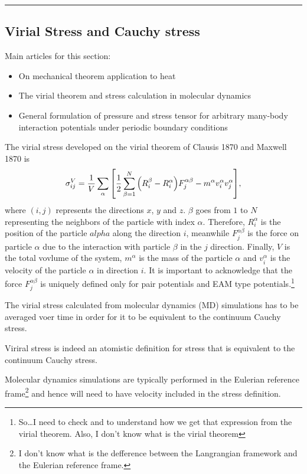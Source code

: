 \documentclass[../../main-notes.tex]{subfiles}
\begin{document}
\noindent\rule{2cm}{0.4pt}

\subsection{Virial Stress and Cauchy stress}


Main articles for this section:
\begin{itemize}
    \item On mechanical theorem application to heat
    \item The virial theorem and stress calculation in molecular dynamics 
    \item General formulation of pressure and stress tensor for arbitrary many-body interaction potentials under periodic boundary conditions
\end{itemize}

The virial stress developed on the virial theorem of Clausis 1870 and Maxwell 1870 is 
\begin{gather}
    \sigma_{ij}^V = \frac{1}{V}\sum_\alpha\qty[\frac{1}{2}\sum_{\beta=1}^N\qty(R_i^\beta-R^\alpha_i)F^{\alpha\beta}_j-m^\alpha v_i^\alpha v_j^\alpha]\label{eqn-mdStress},
\end{gather}
where $(i,j)$ represents the directions $x$, $y$ and $z$.
$\beta$ goes from $1$ to $N$ representing the neighbors of the particle with index $\alpha$.
Therefore, $R^\alpha_i$ is the position of the particle $alpha$ along the direction $i$, meanwhile $F^{\alpha\beta}_j$ is the force on particle $\alpha$ due to the interaction with particle $\beta$ in the $j$ direction.
Finally, $V$ is the total vovlume of the system, $m^\alpha$ is the mass of the particle $\alpha$ and $v^\alpha_i$ is the velocity of the particle $\alpha$ in direction $i$.
It is important to acknowledge that the force $F^{\alpha\beta}_j$ is uniquely defined only for pair potentials and EAM type potentials.\footnote{So\ldots I need to check\citep{Swenson_1983} and\citep{Tsai_1979} to understand how we get that expression from the virial theorem. Also, I don't know what is the virial theorem  }


The virial stress calculated from molecular dynamics (MD) simulations has to be averaged voer time in order for it to be equivalent to the continuum Cauchy stress\citep{Subramaniyan_Sun_2008}.

Viriral stress is indeed an atomistic definition for stress that is equivalent to the continuum Cauchy stress.


Molecular dynamics simulations are typically performed in the Eulerian reference frame\footnote{I don't know what is the defference between the Langrangian framework and the Eulerian reference frame.} and hence will need to have velocity included in the stress definition.
\end{document}
